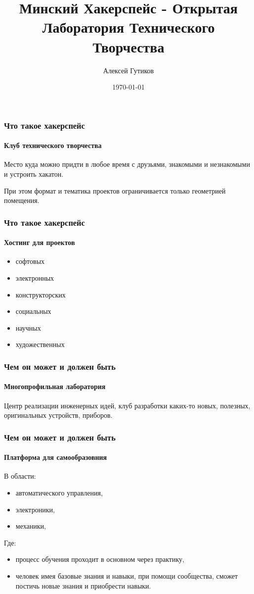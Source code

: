 \documentclass{beamer}
\title[hackerspace.by]
{Минский Хакерспейс - Открытая Лаборатория Технического Творчества}
\author{Алексей Гутиков}
\date{\today}
\newif\ifplacelogo %
\begin{document}

\begin{frame}
\titlepage
\begin{center}
\end{center}
\end{frame}

\placelogotrue

\begin {frame}
\frametitle {Что такое хакерспейс}
\framesubtitle {Клуб технического творчества}
Место куда можно придти в любое время с друзьями, знакомыми и незнакомыми и устроить хакатон. 

При этом формат и тематика проектов ограничивается только геометрией помещения.
\end {frame}


\begin {frame}
\frametitle {Что такое хакерспейс}
\framesubtitle {Хостинг для проектов}
\begin{itemize}
\item софтовых
\item электронных
\item конструкторских
\item социальных
\item научных
\item художественных
\end{itemize}
\end {frame}


\begin {frame}
\frametitle {Чем он может и должен быть}
\framesubtitle {Многопрофильная лаборатория}
Центр реализации инженерных идей, 
клуб разработки каких-то новых, полезных, оригинальных устройств, приборов.
\end {frame}


\begin {frame}
\frametitle {Чем он может и должен быть}
\framesubtitle {Платформа для самообразовния}
В области:
\begin{itemize}
\item автоматического управления, 
\item электроники, 
\item механики, 
\end{itemize}
Где:
\begin{itemize}
\item процесс обучения проходит в основном через практику,
\item человек имея базовые знания и навыки, при помощи сообщества, сможет постичь новые знания и приобрести навыки.
\end{itemize}
\end {frame}
\end{document}
